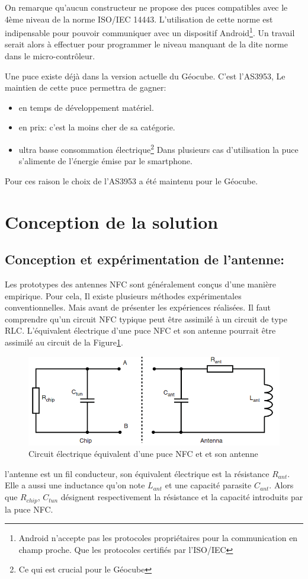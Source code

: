 \documentclass{themeensg}
\begin{document}
On remarque qu'aucun constructeur ne propose des puces compatibles avec le 4ème niveau de la norme ISO/IEC 14443. L'utilisation de cette norme est indipensable pour pouvoir communiquer avec un dispositif Android\footnote{Android n'accepte pas les protocoles propriétaires pour la communication en champ proche. Que les protocoles certifiés par l'ISO/IEC}. Un travail serait alors à effectuer pour programmer le niveau manquant de la dite norme dans le micro-contrôleur.

Une puce existe déjà dans la version actuelle du Géocube. C'est l'AS3953, Le maintien de cette puce permettra de gagner:
\begin{itemize}
\item en temps de développement matériel.
\item en prix: c'est la moins cher de sa catégorie.
\item ultra basse consommation électrique\footnote{Ce qui est crucial pour le Géocube} Dans plusieurs cas d'utilisation la puce s'alimente de l'énergie émise par le smartphone.
\end{itemize}
Pour ces raison le choix de l'AS3953 a été maintenu pour le Géocube.

\section{Conception de la solution}

\subsection{Conception et expérimentation de l'antenne:}

Les prototypes des antennes NFC sont généralement conçus d'une manière empirique. Pour cela, Il existe plusieurs méthodes expérimentales conventionnelles. Mais avant de présenter les expériences réalisées. Il faut comprendre qu'un circuit NFC typique peut être assimilé à un circuit de type RLC. L'équivalent électrique d'une puce NFC et son antenne pourrait être assimilé au circuit de la Figure\ref{fig:nfcandantenna}.

\begin{figure}[h!]
\centering
\label{fig:nfcandantenna}
\includegraphics[scale=0.5]{images/chipANDantenna.png}
\caption{Circuit électrique équivalent d'une puce NFC et et son antenne}
\end{figure}
l'antenne est un fil conducteur, son équivalent électrique est la résistance $R_{ant}$. Elle a aussi une inductance qu'on note $L_{ant}$ et une capacité parasite $C_{ant}$. Alors que $R_{chip}$, $C_{tun}$ désignent respectivement la résistance et la capacité introduits par la puce NFC.
\end{document}
